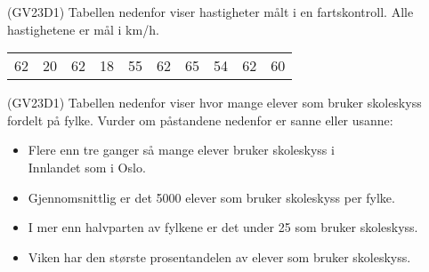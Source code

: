 (GV23D1) \os
Tabellen nedenfor viser hastigheter målt i en
fartskontroll. Alle hastighetene er mål i km/h.
\begin{center}
	\begin{tabular}{|c|c|c|c|c|c|c|c|c|c|}
		62 & 20 & 62 & 18 & 55 & 62 & 65 & 54 & 62 & 60
	\end{tabular}
\end{center}
\newpage
{}
(GV23D1) \os
Tabellen nedenfor viser hvor mange elever som bruker skoleskyss fordelt på fylke. \vs
{}
Vurder om påstandene nedenfor er sanne eller usanne:
\begin{itemize}
	\item Flere enn tre ganger så mange elever bruker
	skoleskyss i \\ Innlandet som i Oslo.
	\item Gjennomsnittlig er det 5000 elever som bruker
	skoleskyss per fylke.
	\item I mer enn halvparten av fylkene er det under 25 %
	som bruker skoleskyss.
	\item Viken har den største prosentandelen av elever som bruker skoleskyss.
\end{itemize}



